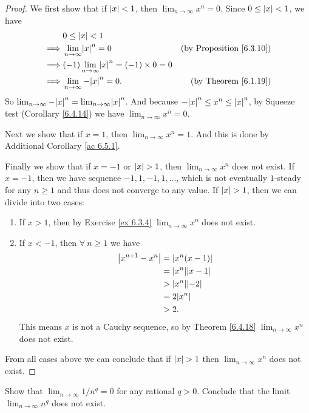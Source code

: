 \begin{proof}
We first show that if \(\abs*{x} < 1\), then \(\lim_{n \to \infty} x^n = 0\).
Since \(0 \leq \abs*{x} < 1\), we have
\begin{align*}
& 0 \leq \abs*{x} < 1 \\
\implies & \lim_{n \to \infty} \abs*{x}^n = 0 & \text{(by Proposition \ref{6.3.10})} \\
\implies & (-1)\lim_{n \to \infty} \abs*{x}^n = (-1) \times 0 = 0 \\
\implies & \lim_{n \to \infty} -\abs*{x}^n = 0. & \text{(by Theorem \ref{6.1.19})}
\end{align*}
So \(\lim_{n \to \infty} -\abs*{x}^n = \lim_{n \to \infty} \abs*{x}^n\).
And because \(-\abs*{x}^n \leq x^n \leq \abs*{x}^n\), by Squeeze test (Corollary \ref{6.4.14}) we have \(\lim_{n \to \infty} x^n = 0\).

Next we show that if \(x = 1\), then \(\lim_{n \to \infty} x^n = 1\).
And this is done by Additional Corollary \ref{ac 6.5.1}.

Finally we show that if \(x = -1\) or \(\abs*{x} > 1\), then \(\lim_{n \to \infty} x^n\) does not exist.
If \(x = -1\), then we have sequence \(-1, 1, -1, 1, \dots\), which is not eventually \(1\)-steady for any \(n \geq 1\) and thus does not converge to any value.
If \(\abs*{x} > 1\), then we can divide into two cases:
\begin{enumerate}
    \item If \(x > 1\), then by Exercise \ref{ex 6.3.4} \(\lim_{n \to \infty} x^n\) does not exist.
    \item If \(x < -1\), then \(\forall\ n \geq 1\) we have
    \begin{align*}
        \abs*{x^{n + 1} - x^n} &= \abs*{x^n(x - 1)} \\
        &= \abs*{x^n}\abs*{x - 1} \\
        &> \abs*{x^n}\abs*{-2} \\
        &= 2\abs*{x^n} \\
        &> 2.
    \end{align*}
    This means \(x\) is not a Cauchy sequence, so by Theorem \ref{6.4.18} \(\lim_{n \to \infty} x^n\) does not exist.
\end{enumerate}
From all cases above we can conclude that if \(\abs*{x} > 1\) then \(\lim_{n \to \infty} x^n\) does not exist.
\end{proof}

\exercisesection

\begin{exercise}\label{ex 6.5.1}
Show that \(\lim_{n \to \infty} 1 / n^q = 0\) for any rational \(q > 0\).
Conclude that the limit \(\lim_{n \to \infty} n^q\) does not exist.
\end{exercise}

